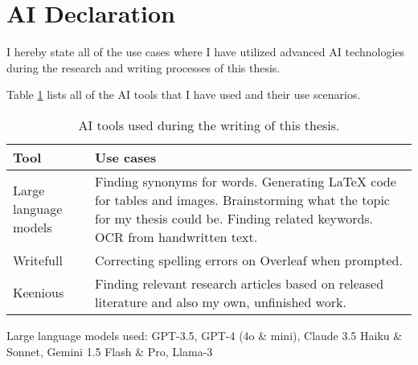 


\chapter*{AI Declaration\label{extra:declaration}}

I hereby state all of the use cases where I have utilized advanced AI technologies during the research and writing processes of this thesis.

Table \ref{table:declaration} lists all of the AI tools that I have used and their use scenarios.

\begin{table}[h]
  \centering
  \begin{tabularx}{\textwidth}{>{\hsize=0.3\hsize}X >{\hsize=0.7\hsize}X}  
    \hline
    \textbf{Tool} & \textbf{Use cases} \\
    \hline
    Large language models & Finding synonyms for words. Generating LaTeX code for tables and images. Brainstorming what the topic for my thesis could be. Finding related keywords. OCR from handwritten text.\\
    \hline
    Writefull & Correcting spelling errors on Overleaf when prompted. \\
    \hline
    Keenious & Finding relevant research articles based on released literature and also my own, unfinished work. \\
    \hline
  \end{tabularx}
  \caption{AI tools used during the writing of this thesis.}
  \label{table:declaration}
\end{table}

Large language models used: GPT-3.5, GPT-4 (4o \& mini), Claude 3.5 Haiku \& Sonnet, Gemini 1.5 Flash \& Pro, Llama-3